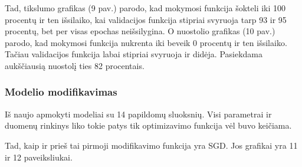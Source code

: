 \documentclass{VUMIFPSkursinis}
\begin{document}
Tad, tikslumo grafikas (9 pav.) parodo, kad mokymosi funkcija šokteli iki 100 procentų ir ten išsilaiko, kai validacijos funkcija stipriai svyruoja tarp 93 ir 95 procentų, bet per visas epochas neišsilygina.
O nuostolio grafikas (10 pav.) parodo, kad mokymosi funkcija nukrenta iki beveik 0 procentų ir ten išsilaiko. Tačiau validacijos funkcija labai stipriai svyruoja ir didėja. Pasiekdama aukščiausią nuostolį ties 82 procentais.

\subsubsection{Modelio modifikavimas}
Iš naujo apmokyti modeliai su 14 papildomų sluoksnių. Visi parametrai ir duomenų rinkinys liko tokie patys tik optimizavimo funkcija vėl buvo keičiama.

Tad, kaip ir prieš tai pirmoji modifikavimo funkcija yra SGD. Jos grafikai yra 11 ir 12 paveiksliukai.
\end{document}
